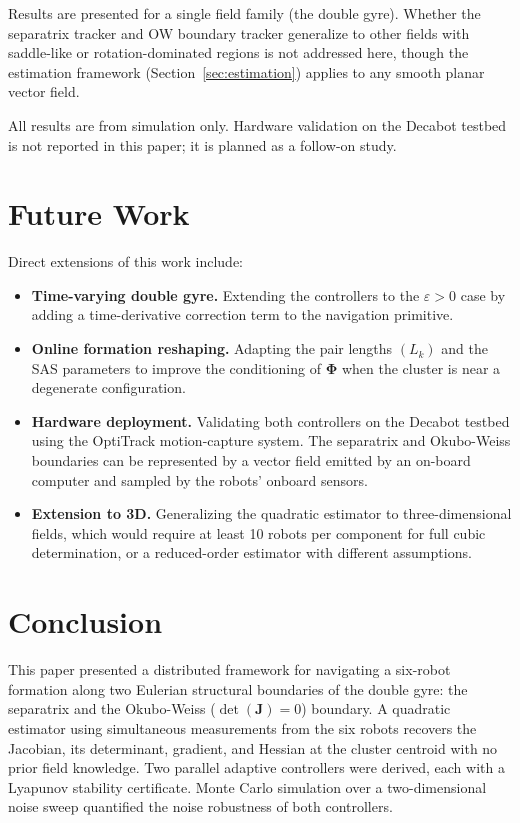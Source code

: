 \documentclass[lettersize,journal]{IEEEtran}
\begin{document}
Results are presented for a single field family (the double gyre). Whether
the separatrix tracker and OW boundary tracker generalize to other fields
with saddle-like or rotation-dominated regions is not addressed here,
though the estimation framework (Section~\ref{sec:estimation}) applies
to any smooth planar vector field.

All results are from simulation only. Hardware validation on the Decabot
testbed is not reported in this paper; it is planned as a follow-on study.


\section{Future Work}
\label{sec:future}

Direct extensions of this work include:
\begin{itemize}
    \item \textbf{Time-varying double gyre.} Extending the controllers to
          the $\varepsilon > 0$ case by adding a time-derivative correction
          term to the navigation primitive.
    \item \textbf{Online formation reshaping.} Adapting the pair lengths
          $(L_k)$ and the SAS parameters to improve the conditioning of
          $\boldsymbol{\Phi}$ when the cluster is near a degenerate
          configuration.
    \item \textbf{Hardware deployment.} Validating both controllers on the
          Decabot testbed using the OptiTrack motion-capture system. The
          separatrix and Okubo-Weiss boundaries can be represented by a
          vector field emitted by an on-board computer and sampled by
          the robots' onboard sensors.
    \item \textbf{Extension to 3D.} Generalizing the quadratic estimator
          to three-dimensional fields, which would require at least 10 robots
          per component for full cubic determination, or a reduced-order
          estimator with different assumptions.
\end{itemize}


\section{Conclusion}
\label{sec:conclusion}

This paper presented a distributed framework for navigating a six-robot
formation along two Eulerian structural boundaries of the double gyre: the
separatrix and the Okubo-Weiss ($\det(\mathbf{J}) = 0$) boundary. A quadratic
estimator using simultaneous measurements from the six robots recovers the
Jacobian, its determinant, gradient, and Hessian at the cluster centroid with
no prior field knowledge. Two parallel adaptive controllers were derived, each
with a Lyapunov stability certificate. Monte Carlo simulation over a
two-dimensional noise sweep quantified the noise robustness of both
controllers.
\end{document}
